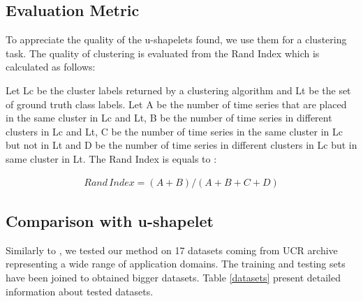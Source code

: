 \subsection{Evaluation Metric}
To appreciate the quality of the u-shapelets found, we use them for a clustering task. The quality of clustering is evaluated from the Rand Index \cite{rand1971objective} which is calculated as follows:

Let Lc be the cluster labels returned by a clustering algorithm and Lt be the
set of ground truth class labels. Let A be the number of time series that are
placed in the same cluster in Lc and Lt, B be the number of time series in
different clusters in Lc and Lt, C be the number of time series in the same
cluster in Lc but not in Lt and D be the number of time series in different
clusters in Lc but in same cluster in Lt. The Rand Index is equals to : 

\begin{eqnarray}
Rand\,Index = (A+B)/(A+B+C+D)
\end{eqnarray}    

\subsection{Comparison with u-shapelet}
Similarly to \cite{dallachiesa}, we tested our method on 17 datasets coming from UCR archive \cite{UCRArchive} representing a wide range of application domains. The training and testing sets have been joined to obtained bigger datasets. Table \ref{datasets} present detailed information about tested datasets.



